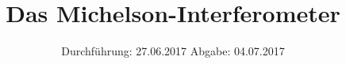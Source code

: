 


\subject{V401}
\title{\texorpdfstring{Das Michelson-Interferometer}{}}
\date{
	Durchführung: 27.06.2017
	\hspace{4em}
	Abgabe: 04.07.2017
}


	\maketitle
	\newpage
	\tableofcontents
	\newpage
	
	
	
	
	
	
	\newpage

	\printbibliography
